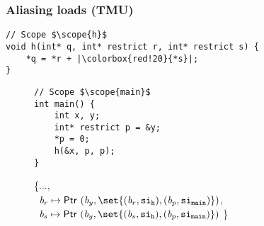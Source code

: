 \begin{frame}[fragile]
\frametitle{Aliasing loads (TMU)}
\begin{verbatim}
// Scope $\scope{h}$
void h(int* q, int* restrict r, int* restrict s) {
    *q = *r + |\colorbox{red!20}{*s}|; 
}
\end{verbatim}

\vspace*{-1cm}

\begin{figure}[!h]
\begin{minipage}[t]{.36\textwidth}

\begin{verbatim}
// Scope $\scope{main}$
int main() {
    int x, y;
    int* restrict p = &y;
    *p = 0;
    h(&x, p, p);
}
\end{verbatim}
\end{minipage}%
\begin{minipage}{.64\textwidth}

\executionannotation
{
\{..., \\\  $\Blockvar_r \mapsto \ptr{(\Blockvar_y, \set{(\Blockvar_r, \scope{h}), (\Blockvar_p, \scope{main})})} $, \\
            \ $\Blockvar_s \mapsto \ptr{(\Blockvar_y, \set{(\Blockvar_s, \scope{h}), (\Blockvar_p, \scope{main})})}$ \}
}
{
}
\end{minipage}
\end{figure}

\end{frame}




